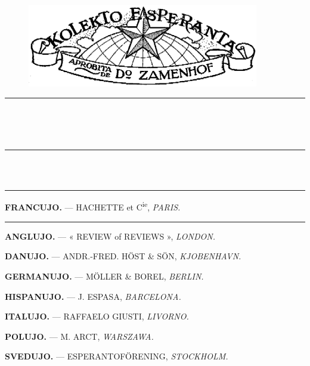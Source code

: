 \documentclass[a5paper,11pt,openany,twoside,leqno]{book}
\begin{document}
\frontmatter

%
%
\vspace*{\fill}
\begin{center}
\nicefont
 {}\\[0.8cm]
 {}\\[0.8cm]
 {}
\end{center}
\vspace*{\fill}
\cleardoublepage

%
%
\thispagestyle{empty}
\begin{center}
 \begin{figure}[!ht]
 \centering \includegraphics[width=0.9\textwidth]{../graphics/terglobo.png}
 \end{figure}
 \nicefont
 
 {\large {}}

 \rule{13mm}{0.4pt}\\[1cm]

 {}\\[0.8cm]
 {}\\[0.8cm]
 {}


 \rule[0.5ex]{13mm}{0.4pt} \\
 {\small {}}\\
 \rule[0.7ex]{13mm}{0.4pt}


\csfont \footnotesize

\textbf{FRANCUJO.} — HACHETTE et C\textsuperscript{ie}, \textit{PARIS.}

\rule[0.9ex]{13mm}{0.4pt}

\textbf{ANGLUJO.} — « REVIEW of REVIEWS », \textit{LONDON.}

\textbf{DANUJO.} — ANDR.-FRED. HÖST \& SÖN, \textit{KJOBENHAVN.}

\textbf{GERMANUJO.} — MÖLLER \& BOREL, \textit{BERLIN.}

\textbf{HISPANUJO.} — J. ESPASA, \textit{BARCELONA.}

\textbf{ITALUJO.} — RAFFAELO GIUSTI, \textit{LIVORNO.}

\textbf{POLUJO.} — M. ARCT, \textit{WARSZAWA.}

\textbf{SVEDUJO.} — ESPERANTOFÖRENING, \textit{STOCKHOLM.}

\end{center}
 
\end{document}
